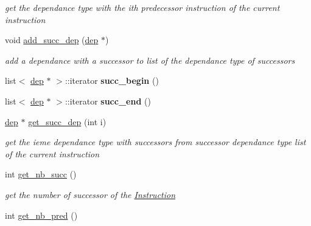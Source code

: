 \begin{DoxyCompactItemize}
\begin{DoxyCompactList}\small\item\em get the dependance type with the ith predecessor instruction of the current instruction \end{DoxyCompactList}\item 
\hypertarget{class_instruction_acefc258dbcf45c19136dc86e47a82c0e}{void \hyperlink{class_instruction_acefc258dbcf45c19136dc86e47a82c0e}{add\+\_\+succ\+\_\+dep} (\hyperlink{structdep}{dep} $\ast$)}\label{class_instruction_acefc258dbcf45c19136dc86e47a82c0e}

\begin{DoxyCompactList}\small\item\em add a dependance with a successor to list of the dependance type of successors \end{DoxyCompactList}\item 
\hypertarget{class_instruction_a2c6f13ddda889e4e2b8b69897de6b733}{list$<$ \hyperlink{structdep}{dep} $\ast$ $>$\+::iterator {\bfseries succ\+\_\+begin} ()}\label{class_instruction_a2c6f13ddda889e4e2b8b69897de6b733}

\item 
\hypertarget{class_instruction_a0800ca0afbbc783b57170d981d406fb6}{list$<$ \hyperlink{structdep}{dep} $\ast$ $>$\+::iterator {\bfseries succ\+\_\+end} ()}\label{class_instruction_a0800ca0afbbc783b57170d981d406fb6}

\item 
\hypertarget{class_instruction_ad3bb47ea5f9e4b975e0191d6c96ffc30}{\hyperlink{structdep}{dep} $\ast$ \hyperlink{class_instruction_ad3bb47ea5f9e4b975e0191d6c96ffc30}{get\+\_\+succ\+\_\+dep} (int i)}\label{class_instruction_ad3bb47ea5f9e4b975e0191d6c96ffc30}

\begin{DoxyCompactList}\small\item\em get the ieme dependance type with successors from successor dependance type list of the current instruction \end{DoxyCompactList}\item 
\hypertarget{class_instruction_ab2d8c29efa78ec3c1a70f154a8c2f068}{int \hyperlink{class_instruction_ab2d8c29efa78ec3c1a70f154a8c2f068}{get\+\_\+nb\+\_\+succ} ()}\label{class_instruction_ab2d8c29efa78ec3c1a70f154a8c2f068}

\begin{DoxyCompactList}\small\item\em get the number of successor of the \hyperlink{class_instruction}{Instruction} \end{DoxyCompactList}\item 
\hypertarget{class_instruction_a9e56e8e2c857abc409f27af9f80f9595}{int \hyperlink{class_instruction_a9e56e8e2c857abc409f27af9f80f9595}{get\+\_\+nb\+\_\+pred} ()}\label{class_instruction_a9e56e8e2c857abc409f27af9f80f9595}


\end{DoxyCompactItemize}
